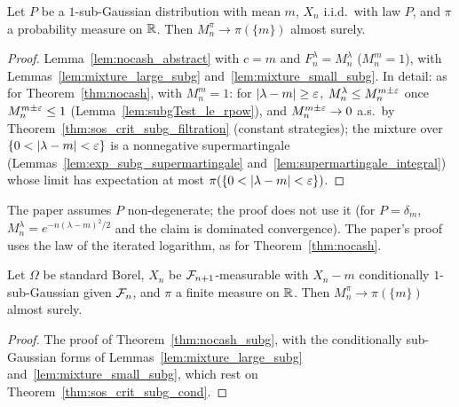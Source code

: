 \begin{theorem}
  \label{thm:nocash_subg}
  \leanok
  Let $P$ be a $1$-sub-Gaussian distribution with mean $m$, $X_n$ i.i.d.\ with law $P$, and $\pi$ a
  probability measure on $\mathbb{R}$. Then $M^\pi_n \to \pi(\{m\})$ almost surely.
\end{theorem}

\begin{proof}
  \leanok
  Lemma~\ref{lem:nocash_abstract} with $c = m$ and $F^\lambda_n = M^\lambda_n$ ($M^m_n = 1$), with
  Lemmas~\ref{lem:mixture_large_subg} and~\ref{lem:mixture_small_subg}. In detail: as for
  Theorem~\ref{thm:nocash}, with $M^m_n = 1$: for $\lvert \lambda - m \rvert \ge \varepsilon$,
  $M^\lambda_n \le M^{m \pm \varepsilon}_n$ once $M^{m \pm \varepsilon}_n \le 1$ (Lemma~\ref{lem:subgTest_le_rpow}),
  and $M^{m\pm\varepsilon}_n \to 0$ a.s.\ by Theorem~\ref{thm:sos_crit_subg_filtration} (constant
  strategies); the mixture over $\{0 < \lvert \lambda - m \rvert < \varepsilon\}$ is a nonnegative supermartingale
  (Lemmas~\ref{lem:exp_subg_supermartingale} and~\ref{lem:supermartingale_integral}) whose limit has
  expectation at most $\pi(\{0 < \lvert \lambda - m \rvert < \varepsilon\})$.
\end{proof}

\begin{remark}
  The paper assumes $P$ non-degenerate; the proof does not use it (for $P = \delta_m$,
  $M^\lambda_n = e^{-n(\lambda - m)^2/2}$ and the claim is dominated convergence). The paper's proof
  uses the law of the iterated logarithm, as for Theorem~\ref{thm:nocash}.
\end{remark}

\begin{theorem}
  \label{thm:nocash_subg_cond}
  \leanok
  Let $\Omega$ be standard Borel, $X_n$ be $\mathcal{F}_{n+1}$-measurable with $X_n - m$ conditionally
  $1$-sub-Gaussian given $\mathcal{F}_n$, and $\pi$ a finite measure on $\mathbb{R}$. Then $M^\pi_n \to \pi(\{m\})$
  almost surely.
\end{theorem}

\begin{proof}
  \leanok
  The proof of Theorem~\ref{thm:nocash_subg}, with the conditionally sub-Gaussian forms of
  Lemmas~\ref{lem:mixture_large_subg} and~\ref{lem:mixture_small_subg}, which rest on
  Theorem~\ref{thm:sos_crit_subg_cond}.
\end{proof}
